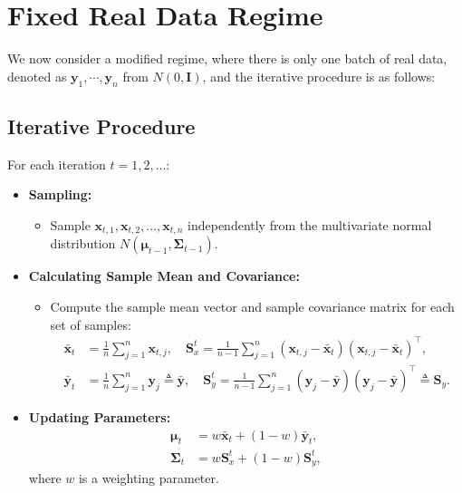 
\section{Fixed Real Data Regime}

We now consider a modified regime, where there is only one batch of real data, denoted as $\bm{y}_{1}, \cdots,\bm{y}_n$ from $N(0,\bm{I})$, and the iterative procedure is as follows:

\subsection*{Iterative Procedure}

For each iteration \( t = 1, 2, \dots \):
\begin{itemize}
    \item \textbf{Sampling:}
    \begin{itemize}
        \item Sample \( \bm{x}_{t,1}, \bm{x}_{t,2}, \dots, \bm{x}_{t,n} \) independently from the multivariate normal distribution \( N(\bm{\mu}_{t-1}, \bm{\Sigma}_{t-1}) \).
    
    \end{itemize}
    
    \item \textbf{Calculating Sample Mean and Covariance:}
    \begin{itemize}
        \item Compute the sample mean vector and sample covariance matrix for each set of samples:
        \begin{align*}
            \bar{\bm{x}}_t &= \frac{1}{n} \sum_{j=1}^{n} \bm{x}_{t,j}, \quad \bm{S}_x^t = \frac{1}{n-1} \sum_{j=1}^{n} (\bm{x}_{t,j} - \bar{\bm{x}}_t)(\bm{x}_{t,j} - \bar{\bm{x}}_t)^\top, \\
            \bar{\bm{y}}_t &= \frac{1}{n} \sum_{j=1}^{n} \bm{y}_{j}\triangleq\bar{\bm{y}}, \quad \bm{S}_y^t = \frac{1}{n-1} \sum_{j=1}^{n} (\bm{y}_{j} - \bar{\bm{y}})(\bm{y}_{j} - \bar{\bm{y}})^\top \triangleq \bm{S}_y.
        \end{align*}
    \end{itemize}

    \item \textbf{Updating Parameters:}
    \begin{align*}
        \bm{\mu}_t &= w \bar{\bm{x}}_t + (1 - w) \bar{\bm{y}}_t, \\
        \bm{\Sigma}_t &= w \bm{S}_x^t + (1 - w) \bm{S}_y^t,
    \end{align*}
    where \( w \) is a weighting parameter.
\end{itemize}

